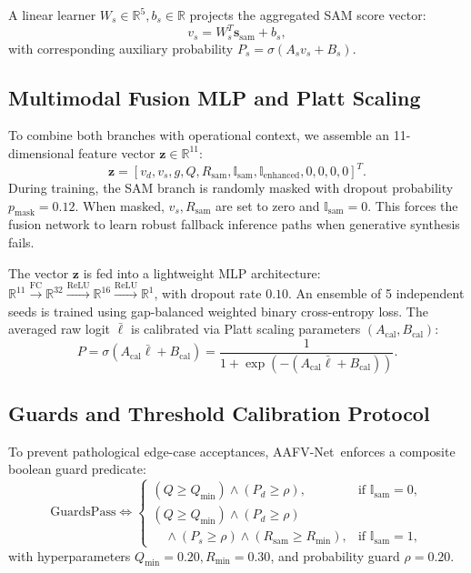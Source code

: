 \documentclass[10pt,journal,compsoc]{IEEEtran}
\newcommand{\sys}{AAFV-Net}
\newcommand{\vect}[1]{\mathbf{#1}}
\begin{document}
A linear learner $W_s \in \mathbb{R}^5, b_s \in \mathbb{R}$ projects the aggregated SAM score vector:
\begin{equation}
v_s = W_s^T \vect{s}_{\text{sam}} + b_s,
\end{equation}
with corresponding auxiliary probability $P_s = \sigma(A_s v_s + B_s)$.

\subsection{Multimodal Fusion MLP and Platt Scaling}
To combine both branches with operational context, we assemble an 11-dimensional feature vector $\vect{z} \in \mathbb{R}^{11}$:
\begin{equation}
\vect{z} = [v_d, v_s, g, Q, R_{\text{sam}}, \mathbb{I}_{\text{sam}}, \mathbb{I}_{\text{enhanced}}, 0, 0, 0, 0]^T.
\end{equation}
During training, the SAM branch is randomly masked with dropout probability $p_{\text{mask}} = 0.12$. When masked, $v_s, R_{\text{sam}}$ are set to zero and $\mathbb{I}_{\text{sam}} = 0$. This forces the fusion network to learn robust fallback inference paths when generative synthesis fails.

The vector $\vect{z}$ is fed into a lightweight MLP architecture: $\mathbb{R}^{11} \xrightarrow{\text{FC}} \mathbb{R}^{32} \xrightarrow{\text{ReLU}} \mathbb{R}^{16} \xrightarrow{\text{ReLU}} \mathbb{R}^{1}$, with dropout rate $0.10$. An ensemble of 5 independent seeds is trained using gap-balanced weighted binary cross-entropy loss. The averaged raw logit $\bar{\ell}$ is calibrated via Platt scaling parameters $(A_{\text{cal}}, B_{\text{cal}})$:
\begin{equation}
P = \sigma(A_{\text{cal}} \bar{\ell} + B_{\text{cal}}) = \frac{1}{1 + \exp(-(A_{\text{cal}} \bar{\ell} + B_{\text{cal}}))}.
\end{equation}

\subsection{Guards and Threshold Calibration Protocol}
To prevent pathological edge-case acceptances, \sys\ enforces a composite boolean guard predicate:
\begin{equation}
\text{GuardsPass} \iff \begin{cases}
(Q \ge Q_{\min}) \land (P_d \ge \rho), & \text{if } \mathbb{I}_{\text{sam}} = 0, \\
(Q \ge Q_{\min}) \land (P_d \ge \rho) \\
\quad \land (P_s \ge \rho) \land (R_{\text{sam}} \ge R_{\min}), & \text{if } \mathbb{I}_{\text{sam}} = 1,
\end{cases}
\end{equation}
with hyperparameters $Q_{\min} = 0.20, R_{\min} = 0.30$, and probability guard $\rho = 0.20$.
\end{document}
